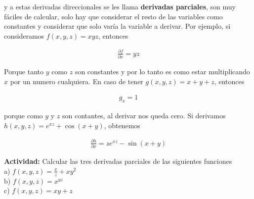 \documentclass{article}
\theoremstyle{plain}
\theoremstyle{definition}
\begin{document}
y a estas derivadas direccionales se les llama \textbf{derivadas parciales}, son muy fáciles de calcular, solo hay que considerar el resto de las variables como constantes y considerar que solo varía la variable a derivar. Por ejemplo, si consideramos $f(x,y,z) = xyz$, entonces

\begin{align*}
   \frac{\partial f}{\partial x} =yz
\end{align*}

Porque tanto $y$ como $z$ son constantes y por lo tanto es como estar multiplicando $x$ por un numero cualquiera. En caso de tener $g(x,y,z) = x+y+z$, entonces


\begin{align*}
   g_x = 1
\end{align*}

porque como $y$ y $z$ son contantes, al derivar nos queda cero. Si derivamos $h(x,y,z) = e^{xz}+\cos(x+y)$, obtenemos

\begin{align*}
   \frac{\partial h}{\partial x} = ze^{xz}-\sin(x+y)
\end{align*}

\textbf{Actividad: } Calcular las tres derivadas parciales de las siguientes funciones\\

a) $\displaystyle f(x,y,z) = \frac{x}{z} + xy^2$ \\

b) $\displaystyle f(x,y,z) = x^{yz}$ \\

c) $\displaystyle f(x,y,z) = xy+z$ \\
\end{document}
